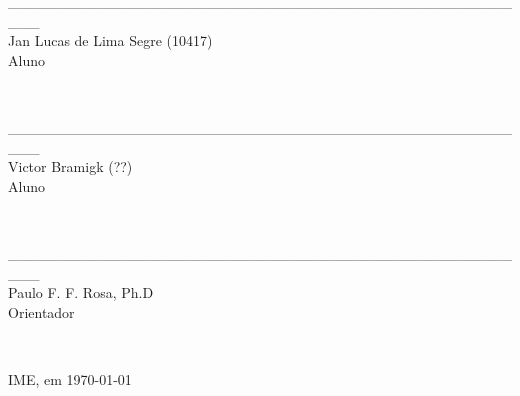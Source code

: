 \newpage

\begin{center}
\_\_\_\_\_\_\_\_\_\_\_\_\_\_\_\_\_\_\_\_\_\_\_\_\_\_\_\_\_\_\_\_\_\_\_\_\_\_\_\_\_\_\_\_\_\_\_\_\_\_\_ \\
Jan Lucas de Lima Segre (10417) \\Aluno \\ 
\end{center}
\hspace{4cm}
\\

\begin{center}
\_\_\_\_\_\_\_\_\_\_\_\_\_\_\_\_\_\_\_\_\_\_\_\_\_\_\_\_\_\_\_\_\_\_\_\_\_\_\_\_\_\_\_\_\_\_\_\_\_\_\_ \\
Victor Bramigk (??) \\Aluno \\ 
\end{center}
\hspace{4cm}
\\


\begin{center}
\_\_\_\_\_\_\_\_\_\_\_\_\_\_\_\_\_\_\_\_\_\_\_\_\_\_\_\_\_\_\_\_\_\_\_\_\_\_\_\_\_\_\_\_\_\_\_\_\_\_\_ \\
Paulo F. F. Rosa, Ph.D \\Orientador \\ 
\end{center}
\hspace{4cm}
\\


%
%


%
%

\begin{center}

IME, em \today
\end{center}

\hspace{4cm}


